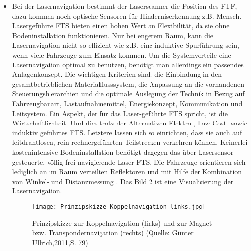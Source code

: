 \begin{itemize}
\begin{figure}[h!]
			\label{Prinzipskizze_Koppelnavigation_rechts}
	\end{figure}	
	\item Bei der Lasernavigation bestimmt der Laserscanner die Position des FTF, dazu kommen noch optische Sensoren f\"ur Hinderniserkennung z.B. Mensch. Lasergef\"uhrte FTS bieten einen hohen Wert an Flexibilit\"at, da sie ohne Bodeninstallation funktionieren. Nur bei engerem Raum, kann die Lasernavigation nicht so effizient wie z.B. eine induktive Spurf\"uhrung sein, wenn viele Fahrzeuge zum Einsatz kommen. Um die Systemvorteile eine Lasernavigation optimal zu benutzen, ben\"otigt man allerdings ein passendes Anlagenkonzept. Die wichtigen Kriterien sind: die Einbindung in den gesamtbetrieblichen Materialflusssystem, die Anpassung an die vorhandenen Steuerungshierarchien und die optimale Auslegung der Technik in Bezug auf Fahrzeugbauart, Lastaufnahmemittel, Energiekonzept, Kommunikation und Leitsystem. Ein Aspekt, der f\"ur das Laser-gef\"uhrte FTS spricht, ist die Wirtschaftlichkeit. Und dies trotz der Alternativen Elektro-, Low-Cost- sowie induktiv gef\"uhrtes FTS. Letztere lassen sich so einrichten, dass sie auch auf leitdrahtlosen, rein rechnergef\"uhrten Teilstrecken verkehren k\"onnen. Keinerlei kostenintensive Bodeninstallation ben\"otigt dagegen das \"uber Lasersensor gesteuerte, v\"ollig frei navigierende Laser-FTS. Die Fahrzeuge orientieren sich lediglich an im Raum verteilten Reflektoren und mit Hilfe der Kombination von Winkel- und Distanzmessung \cite{Werner:2014:Online}. Das Bild \ref{Prinzipskizze_Koppelnavigation_links} ist eine Visualisierung der Lasernavigation.
	\begin{figure}[h!]
		\centering
		\texttt{[image: Prinzipskizze\_Koppelnavigation\_links.jpg]}
		\caption{Prinzipskizze zur Koppelnavigation (links) und zur Magnet- bzw. Transpondernavigation (rechts) (Quelle: G\"unter Ullrich,2011,S. 79)}
		\label{Prinzipskizze_Koppelnavigation_links}
	\end{figure}


\end{itemize}
